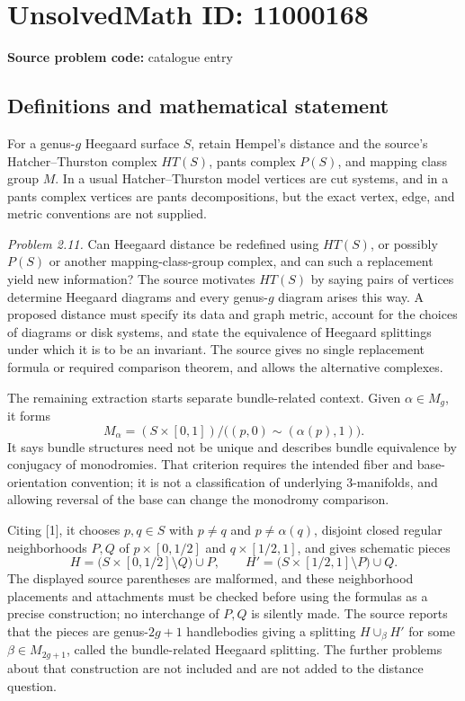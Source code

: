 \documentclass[11pt]{article}
\begin{document}
\section*{UnsolvedMath ID: 11000168}
\textbf{Source problem code:} catalogue entry
\subsection{Definitions and mathematical statement}
For a genus-\(g\) Heegaard surface \(S\), retain Hempel's distance and the source's Hatcher--Thurston complex \(HT(S)\), pants complex \(P(S)\), and mapping class group \(M\). In a usual Hatcher--Thurston model vertices are cut systems, and in a pants complex vertices are pants decompositions, but the exact vertex, edge, and metric conventions are not supplied.

\emph{Problem 2.11.} Can Heegaard distance be redefined using \(HT(S)\), or possibly \(P(S)\) or another mapping-class-group complex, and can such a replacement yield new information? The source motivates \(HT(S)\) by saying pairs of vertices determine Heegaard diagrams and every genus-\(g\) diagram arises this way. A proposed distance must specify its data and graph metric, account for the choices of diagrams or disk systems, and state the equivalence of Heegaard splittings under which it is to be an invariant. The source gives no single replacement formula or required comparison theorem, and allows the alternative complexes.

The remaining extraction starts separate bundle-related context. Given \(\alpha\in M_g\), it forms
\[
 M_\alpha=(S\times[0,1])/\bigl((p,0)\sim(\alpha(p),1)\bigr).
\]
It says bundle structures need not be unique and describes bundle equivalence by conjugacy of monodromies. That criterion requires the intended fiber and base-orientation convention; it is not a classification of underlying \(3\)-manifolds, and allowing reversal of the base can change the monodromy comparison.

Citing [1], it chooses \(p,q\in S\) with \(p\neq q\) and \(p\neq\alpha(q)\), disjoint closed regular neighborhoods \(P,Q\) of \(p\times[0,1/2]\) and \(q\times[1/2,1]\), and gives schematic pieces
\[
 H=\bigl(S\times[0,1/2]\setminus Q\bigr)\cup P,
 \qquad H'=\bigl(S\times[1/2,1]\setminus P\bigr)\cup Q.
\]
The displayed source parentheses are malformed, and these neighborhood placements and attachments must be checked before using the formulas as a precise construction; no interchange of \(P,Q\) is silently made. The source reports that the pieces are genus-\(2g+1\) handlebodies giving a splitting \(H\cup_\beta H'\) for some \(\beta\in M_{2g+1}\), called the bundle-related Heegaard splitting. The further problems about that construction are not included and are not added to the distance question.
\end{document}

